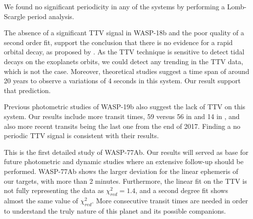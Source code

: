 We found no significant periodicity in any of the systems by performing a Lomb-Scargle period analysis.

The absence of a significant TTV signal in WASP-18b and the poor quality of a second order fit, support the conclusion that there is no evidence for a rapid orbital decay, as proposed by \cite{Wilkins2017}. As the TTV technique is sensitive to detect tidal decays on the exoplanets orbits, we could detect any trending in the TTV data, which is not the case. Moreover, theoretical studies \citep{CollierCameron2018} suggest a time span of around 20 years to observe a variations of 4 seconds in this system. Our result support that prediction.

Previous photometric studies of WASP-19b \citep{Lendl2013,Wong2016} also suggest the lack of TTV on this system. Our results include more transit times, 59 versus 56 in \cite{Wong2016} and 14 in \cite{Lendl2013}, and also more recent transits being the last one from the end of 2017. Finding a no periodic TTV signal is consistent with their results. 

This is the first detailed study of WASP-77Ab. Our results will served as base for future photometric and dynamic studies where an extensive follow-up should be performed. WASP-77Ab shows the larger deviation for the linear ephemeris of our targets, with more than 2 minutes. Furthermore, the linear fit on the TTV is not fully representing the data as $\chi^{2}_{red}=1.4$, and a second degree fit shows almost the same value of $\chi^{2}_{red}$. More consecutive transit times are needed in order to understand the truly nature of this planet and its possible companions.
